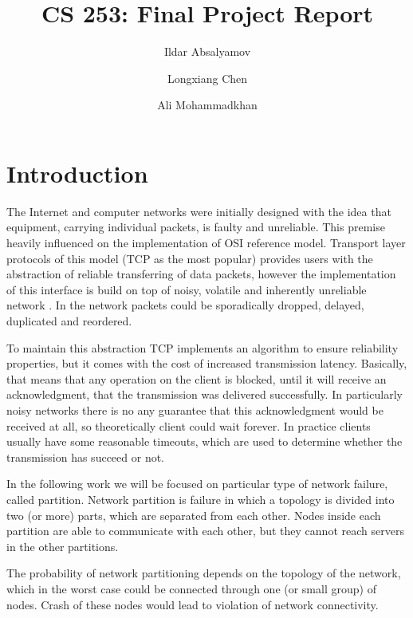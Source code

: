 \documentclass[a4paper]{article}
\title{CS 253: Final Project Report}
\author{Ildar Absalyamov \and Longxiang Chen \and Ali Mohammadkhan}
\begin{document}
\maketitle

\section{Introduction}

The Internet and computer networks were initially designed with the idea that equipment, carrying individual packets, is faulty and unreliable.
This premise heavily influenced on the implementation of OSI reference model.
Transport layer protocols of this model (TCP as the most popular) provides users with the abstraction of reliable transferring of data packets, however the implementation of this interface is build on top of noisy, volatile and inherently unreliable network \cite{deutsch1992eight}.
In the network packets could be sporadically dropped, delayed, duplicated and reordered.

To maintain this abstraction TCP implements an algorithm to ensure reliability properties, but it comes with the cost of increased transmission latency.
Basically, that means that any operation on the client is blocked, until it will receive an acknowledgment, that the transmission was delivered successfully. 
In particularly noisy networks there is no any guarantee that this acknowledgment would be received at all, so theoretically client could wait forever.
In practice clients usually have some reasonable timeouts, which are used to determine whether the transmission has succeed or not.

In the following work we will be focused on particular type of network failure, called partition.
Network partition is failure in which a topology is divided into two (or more) parts, which are separated from each other.
Nodes inside each partition are able to communicate with each other, but they cannot reach servers in the other partitions.

The probability of network partitioning depends on the topology of the network, which in the worst case could be connected through one (or small group) of nodes.
Crash of these nodes would lead to violation of network connectivity.
\end{document}
